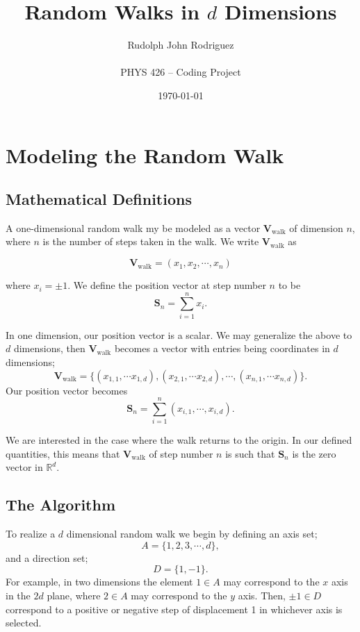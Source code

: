 \documentclass{article}
\title{Random Walks in $d$ Dimensions}
\author{Rudolph John Rodriguez \\ \\  PHYS 426 -- Coding Project}
\date{\today}
\begin{document}
\maketitle

\section{Modeling the Random Walk}
\subsection{Mathematical Definitions}
A one-dimensional random walk my be modeled as a vector $\mathbf{V}_\text{walk}$ of dimension $n$, where $n$ is the number of steps taken in the walk. We write $\mathbf{V}_\text{walk}$ as 

\begin{equation}
    \mathbf{V}_\text{walk} = (x_1, x_2,\cdots , x_n)
\end{equation}

where $x_i = \pm 1$. We define the position vector at step number $n$ to be
\begin{equation}
    \mathbf{S}_n = \sum_{i=1}^n x_i.
\end{equation}

In one dimension, our position vector is a scalar. We may generalize the above to $d$ dimensions, then $\mathbf{V}_\text{walk}$ becomes a vector with entries being coordinates in $d$ dimensions;
\begin{equation} 
    \mathbf{V}_\text{walk} = \{(x_{1,1}, \cdots x_{1,d}), (x_{2,1}, \cdots x_{2,d}),\cdots , (x_{n,1}, \cdots x_{n,d})\}.
\end{equation}
Our position vector becomes
\begin{equation}
    \mathbf{S}_n = \sum_{i=1}^n (x_{i,1}, \cdots, x_{i,d}).
\end{equation}

We are interested in the case where the walk returns to the origin. In our defined quantities, this means that $\mathbf{V}_\text{walk}$ of step number $n$ is such that $\mathbf{S}_n$ is the zero vector in $\mathbb{R}^d$.

\subsection{The Algorithm}

To realize a $d$ dimensional random walk we begin by defining an axis set;
\begin{equation}
    A = \{1,2,3,\cdots, d\},
\end{equation}
and a direction set;
\begin{equation}
    D = \{1,-1\}.
\end{equation}
For example, in two dimensions the element $1 \in A$ may correspond to the $x$ axis in the $2d$ plane, where $2 \in A$ may correspond to the $y$ axis. Then, $\pm 1 \in D$ correspond to a positive or negative step of displacement 1 in whichever axis is selected.
\end{document}
